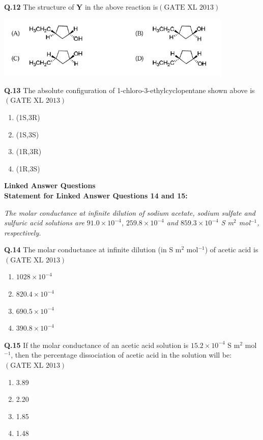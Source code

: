 \documentclass[12pt]{article}
\theoremstyle{remark}
\providecommand{\brak}[1]{\ensuremath{\left(#1\right)}}
\begin{document}
\textbf{Q.12} The structure of \textbf{Y} in the above reaction is\hfill $\brak{\text{GATE XL 2013}}$
\begin{center}
    \includegraphics[width=0.85\textwidth]{figs/Screenshot 2025-08-05 115721.png}
\end{center}

\textbf{Q.13} The absolute configuration of 1-chloro-3-ethylcyclopentane shown above is\hfill $\brak{\text{GATE XL 2013}}$
\begin{enumerate}
    \item (1S,3R)
    \item (1S,3S)
    \item (1R,3R)
    \item (1R,3S)
\end{enumerate}

\noindent\textbf{Linked Answer Questions}\\
\noindent\textbf{Statement for Linked Answer Questions 14 and 15: }

\noindent\textit{The molar conductance at infinite dilution of sodium acetate, sodium sulfate and sulfuric acid solutions are $91.0 \times 10^{-4}$, $259.8 \times 10^{-4}$ and $859.3 \times 10^{-4}$ S m$^2$ mol$^{-1}$, respectively.}

\textbf{Q.14} The molar conductance at infinite dilution (in S m$^2$ mol$^{-1}$) of acetic acid is\hfill $\brak{\text{GATE XL 2013}}$
\begin{enumerate}
    \item $1028 \times 10^{-4}$
    \item $820.4 \times 10^{-4}$
    \item $690.5 \times 10^{-4}$
    \item $390.8 \times 10^{-4}$
\end{enumerate}

\textbf{Q.15} If the molar conductance of an acetic acid solution is $15.2 \times 10^{-4}$ S m$^2$ mol$^{-1}$, then the percentage dissociation of acetic acid in the solution will be:\hfill $\brak{\text{GATE XL 2013}}$
\begin{enumerate}
    \item 3.89
    \item 2.20
    \item 1.85
    \item 1.48
\end{enumerate}
\end{document}
